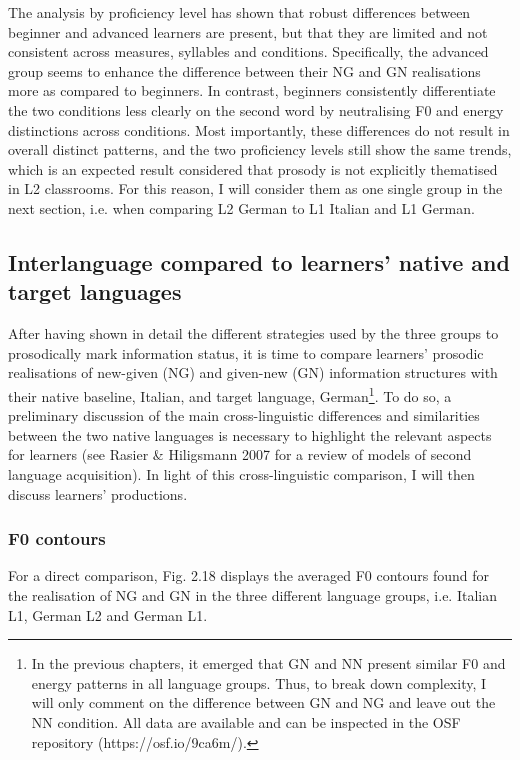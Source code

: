 \begin{styleStandard}
The analysis by proficiency level has shown that robust differences between beginner and advanced learners are present, but that they are limited and not consistent across measures, syllables and conditions. Specifically, the advanced group seems to enhance the difference between their NG and GN realisations more as compared to beginners. In contrast, beginners consistently differentiate the two conditions less clearly on the second word by neutralising F0 and energy distinctions across conditions. Most importantly, these differences do not result in overall distinct patterns, and the two proficiency levels still show the same trends, which is an expected result considered that prosody is not explicitly thematised in L2 classrooms. For this reason, I will consider them as one single group in the next section, i.e. when comparing L2 German to L1 Italian and L1 German.
\end{styleStandard}

\subsection[Interlanguage compared to learners’ native and target languages]{Interlanguage compared to learners’ native and target languages}
\hypertarget{Toc191305911}{}\begin{styleStandard}
After having shown in detail the different strategies used by the three groups to prosodically mark information status, it is time to compare learners’ prosodic realisations of new-given (NG) and given-new (GN) information structures with their native baseline, Italian, and target language, German\footnote{In the previous chapters, it emerged that GN and NN present similar F0 and energy patterns in all language groups. Thus, to break down complexity, I will only comment on the difference between GN and NG and leave out the NN condition. All data are available and can be inspected in the OSF repository (https://osf.io/9ca6m/).}. To do so, a preliminary discussion of the main cross-linguistic differences and similarities between the two native languages is necessary to highlight the relevant aspects for learners (see Rasier \& Hiligsmann 2007 for a review of models of second language acquisition). In light of this cross-linguistic comparison, I will then discuss learners’ productions. 
\end{styleStandard}

\subsubsection{F0 contours}
\hypertarget{Toc191305912}{}\begin{styleStandard}
For a direct comparison, Fig. 2.18 displays the averaged F0 contours found for the realisation of NG and GN in the three different language groups, i.e. Italian L1, German L2 and German L1.
\end{styleStandard}


